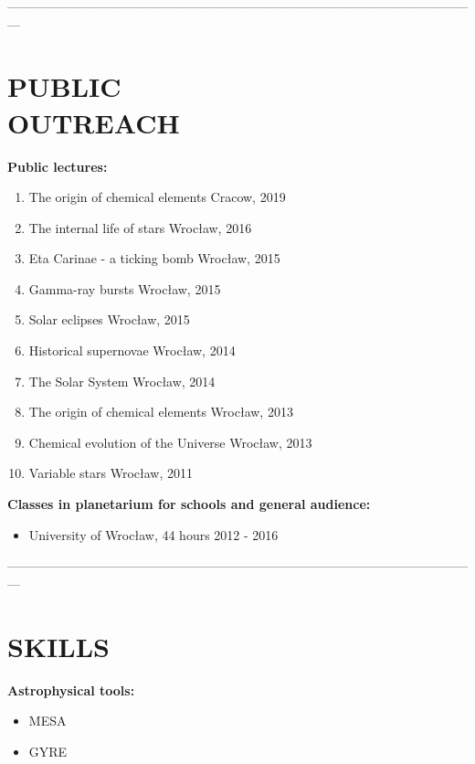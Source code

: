 \documentclass[margin, 10pt]{res} %
\begin{document}
\begin{resume}
---------------------------------------------------------------------------------------------------------------

\section{PUBLIC \\ OUTREACH}  

\textbf{Public lectures:}
\begin{enumerate}[noitemsep]
    \item The origin of chemical elements \hfill Cracow, 2019
    \item The internal life of stars \hfill  Wroc\l{}aw, 2016
    \item Eta Carinae - a ticking bomb \hfill Wroc\l{}aw, 2015
    \item Gamma-ray bursts \hfill Wroc\l{}aw, 2015
    \item Solar eclipses \hfill Wroc\l{}aw, 2015
    \item Historical supernovae \hfill Wroc\l{}aw, 2014
    \item The Solar System \hfill Wroc\l{}aw, 2014
    \item The origin of chemical elements \hfill Wroc\l{}aw, 2013
    \item Chemical evolution of the Universe \hfill Wroc\l{}aw, 2013
    \item Variable stars \hfill Wroc\l{}aw, 2011
\end{enumerate}

\textbf{Classes in planetarium for schools and general audience:}
\begin{itemize}[noitemsep]
    \item University of Wroc\l{}aw, 44 hours \hfill 2012 - 2016
\end{itemize}

---------------------------------------------------------------------------------------------------------------

\section{SKILLS}

\textbf{Astrophysical tools:}
\begin{itemize}[noitemsep]
    \item MESA
    \item GYRE
\end{itemize}


\end{resume}
\end{document}
